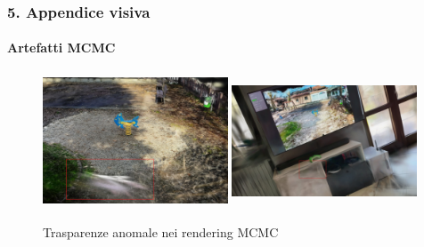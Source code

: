 \newpage
\subsubsection*{5. Appendice visiva}

\paragraph{Artefatti MCMC}
\begin{figure}[H]
	\centering
	\includegraphics[width=0.49\textwidth,height=4cm,trim={80 40 80 40},clip]{images/benchmarks/spring_rider_mcmc_defect.jpg}
	\includegraphics[width=0.49\textwidth,height=4cm,trim={80 40 80 40},clip]{images/benchmarks/my_workstation_mcmc_defect.jpg}
	\caption{Trasparenze anomale nei rendering MCMC}
	\label{fig:mcmc_transparency_defects}
\end{figure}

